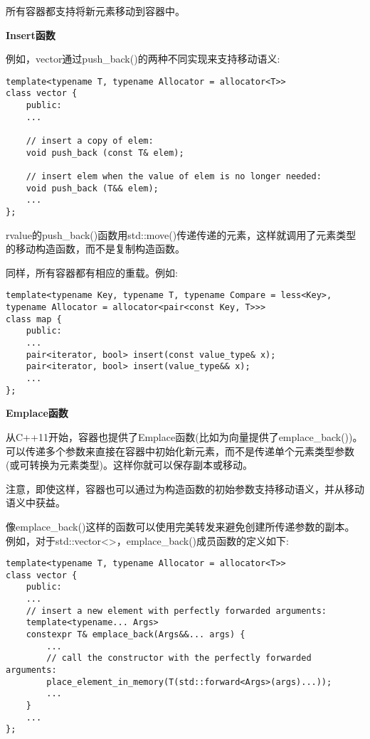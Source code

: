 所有容器都支持将新元素移动到容器中。\par

\hspace*{\fill} \par %
\textbf{Insert函数}

例如，vector通过push\_back()的两种不同实现来支持移动语义:\par

\begin{lstlisting}[caption={}]
template<typename T, typename Allocator = allocator<T>>
class vector {
	public:
	...
	
	// insert a copy of elem:
	void push_back (const T& elem);
	
	// insert elem when the value of elem is no longer needed:
	void push_back (T&& elem);
	...
};
\end{lstlisting}

rvalue的push\_back()函数用std::move()传递传递的元素，这样就调用了元素类型的移动构造函数，而不是复制构造函数。\par

同样，所有容器都有相应的重载。例如:\par

\begin{lstlisting}[caption={}]
template<typename Key, typename T, typename Compare = less<Key>,
typename Allocator = allocator<pair<const Key, T>>>
class map {
	public:
	...
	pair<iterator, bool> insert(const value_type& x);
	pair<iterator, bool> insert(value_type&& x);
	...
};
\end{lstlisting}

\hspace*{\fill} \par %
\textbf{Emplace函数}

从C++11开始，容器也提供了Emplace函数(比如为向量提供了emplace\_back())。可以传递多个参数来直接在容器中初始化新元素，而不是传递单个元素类型参数(或可转换为元素类型)。这样你就可以保存副本或移动。\par

注意，即使这样，容器也可以通过为构造函数的初始参数支持移动语义，并从移动语义中获益。\par

像emplace\_back()这样的函数可以使用完美转发来避免创建所传递参数的副本。例如，对于std::vector<>，emplace\_back()成员函数的定义如下:\par

\begin{lstlisting}[caption={}]
template<typename T, typename Allocator = allocator<T>>
class vector {
	public:
	...
	// insert a new element with perfectly forwarded arguments:
	template<typename... Args>
	constexpr T& emplace_back(Args&&... args) {
		...
		// call the constructor with the perfectly forwarded arguments:
		place_element_in_memory(T(std::forward<Args>(args)...));
		...
	}
	...
};
\end{lstlisting}

